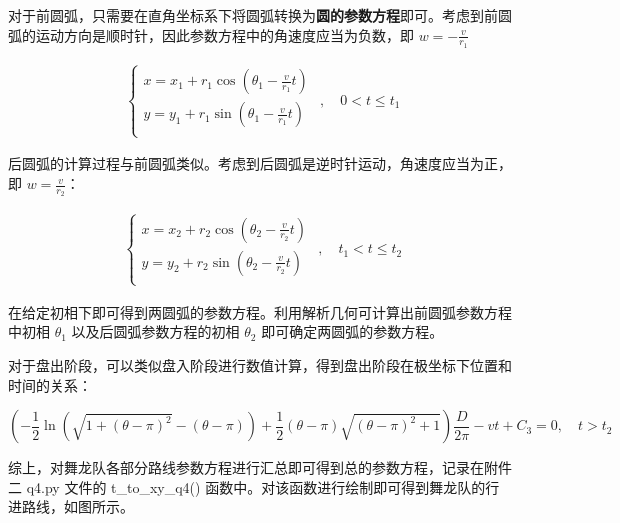 \documentclass[a4paper]{article}
\begin{document}
		对于前圆弧，只需要在直角坐标系下将圆弧转换为\textbf{圆的参数方程}即可。考虑到前圆弧的运动方向是顺时针，因此参数方程中的角速度应当为负数，即 $w = -\frac{v}{r_1}$ 
		
		\begin{equation}
			\begin{aligned}
				\left\{
					\begin{array}{l}
						x = x_1 + r_1 \cos(\theta_1 - \frac{v}{r_1}t) \\
						y = y_1 + r_1 \sin(\theta_1 - \frac{v}{r_1}t) \\
					\end{array}
				\right.
			\end{aligned}
			, \quad 0 < t \le t_1
		\end{equation}
		
		后圆弧的计算过程与前圆弧类似。考虑到后圆弧是逆时针运动，角速度应当为正，即 $w = \frac{v}{r_2} $：
		
		\begin{equation}
			\begin{aligned}
				\left\{
				\begin{array}{l}
					x = x_2 + r_2 \cos(\theta_2 - \frac{v}{r_2}t) \\
					y = y_2 + r_2 \sin(\theta_2 - \frac{v}{r_2}t) \\
				\end{array}
				\right.
			\end{aligned}
			, \quad t_1 < t \le t_2
		\end{equation}
		
		在给定初相下即可得到两圆弧的参数方程。利用解析几何可计算出前圆弧参数方程中初相 $\theta_1$ 以及后圆弧参数方程的初相 $\theta_2$ 即可确定两圆弧的参数方程。
		
		对于盘出阶段，可以类似盘入阶段进行数值计算，得到盘出阶段在极坐标下位置和时间的关系：
		
		\begin{equation}
			(- \frac{1}{2}\ln(\sqrt{1 + (\theta - \pi)^2} - (\theta - \pi)) + \frac{1}{2} (\theta - \pi) \sqrt{(\theta - \pi)^2 + 1}) \frac{D}{2 \pi} - vt + C_3 = 0, \quad t > t_2
		\end{equation}
		
		综上，对舞龙队各部分路线参数方程进行汇总即可得到总的参数方程，记录在附件二 q4.py 文件的 t\_to\_xy\_q4() 函数中。对该函数进行绘制即可得到舞龙队的行进路线，如图所示。
		
\end{document}
